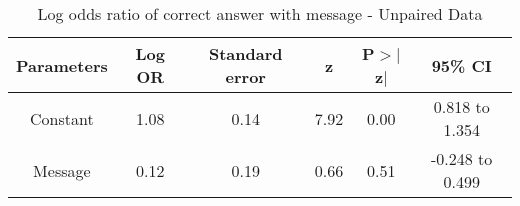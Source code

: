\begin{table}[htbp]
\centering
\caption{Log odds ratio of correct answer with message - Unpaired Data} 
\label{lormesgup}
\begin{tabular}{cccccc}
  \toprule
Parameters & Log OR & Standard error & z & P$>$$|$z$|$ & 95\% CI \\ 
  \midrule
Constant & 1.08 & 0.14 & 7.92 & 0.00 & 0.818 to 1.354 \\ 
  Message & 0.12 & 0.19 & 0.66 & 0.51 & -0.248 to 0.499 \\ 
   \bottomrule
\end{tabular}
\end{table}
